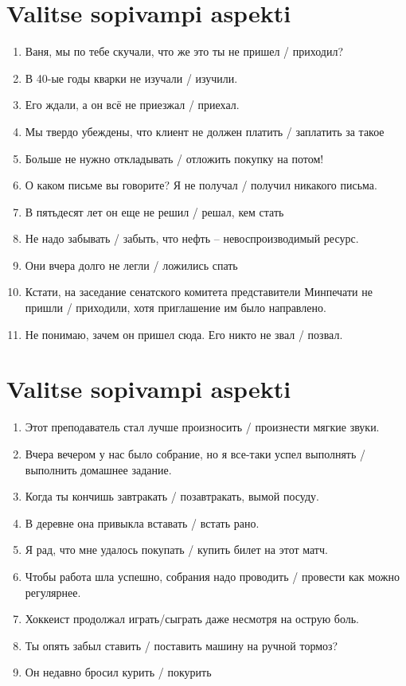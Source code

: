\documentclass[paper=a4, fontsize=11pt]{scrartcl}
\begin{document}
\section{Valitse sopivampi aspekti} 

\begin{enumerate}
    \item Ваня, мы по тебе скучали, что же это ты не пришел / приходил?
    \item В 40-ые годы кварки не изучали / изучили.
    \item Его ждали, а он всё не приезжал / приехал.
    \item Мы твердо убеждены, что клиент не должен  платить / заплатить за такое
    \item Больше не нужно откладывать / отложить покупку на потом! 
    \item О каком письме вы говорите? Я не получал / получил никакого письма.
    \item В пятьдесят лет он еще не решил / решал, кем стать
    \item Не надо забывать / забыть, что нефть -- невоспроизводимый ресурс.
    \item Они вчера долго не легли / ложились спать
    \item Кстати, на заседание сенатского комитета представители Минпечати не пришли / приходили, хотя приглашение им было направлено.
    \item Не понимаю, зачем он пришел сюда. Его никто не звал / позвал.
\end{enumerate}



\section{Valitse sopivampi aspekti} 

\begin{enumerate}
    \item Этот преподаватель стал лучше произносить / произнести мягкие звуки.
    \item Вчера вечером у нас было собрание, но я все-таки успел выполнять / выполнить домашнее задание.
    \item Когда ты кончишь завтракать / позавтракать, вымой посуду.
    \item В деревне она привыкла вставать / встать рано.
    \item Я рад, что мне удалось покупать / купить билет на этот матч.
    \item Чтобы работа шла успешно, собрания надо проводить / провести как можно регулярнее.
    \item Хоккеист продолжал играть/сыграть даже несмотря на острую боль.
    \item Ты опять забыл ставить / поставить машину на ручной тормоз?
    \item Он недавно бросил курить / покурить
\end{enumerate}
\end{document}
